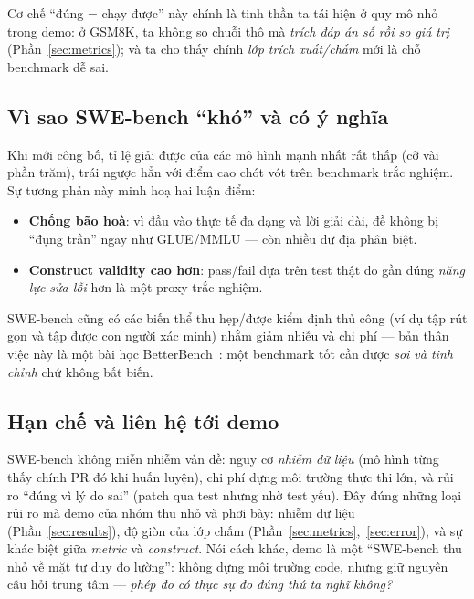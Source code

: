 Cơ chế ``đúng = chạy được'' này chính là tinh thần ta tái hiện ở quy mô nhỏ trong
demo: ở GSM8K, ta không so chuỗi thô mà \emph{trích đáp án số rồi so giá trị}
(Phần~\ref{sec:metrics}); và ta cho thấy chính \emph{lớp trích xuất/chấm} mới là
chỗ benchmark dễ sai.

\subsection{Vì sao SWE-bench ``khó'' và có ý nghĩa}

Khi mới công bố, tỉ lệ giải được của các mô hình mạnh nhất rất thấp (cỡ vài phần
trăm), trái ngược hẳn với điểm cao chót vót trên benchmark trắc nghiệm. Sự tương
phản này minh hoạ hai luận điểm:

\begin{itemize}
  \item \textbf{Chống bão hoà}: vì đầu vào thực tế đa dạng và lời giải dài, đề
    không bị ``đụng trần'' ngay như GLUE/MMLU --- còn nhiều dư địa phân biệt.
  \item \textbf{Construct validity cao hơn}: pass/fail dựa trên test thật đo gần
    đúng \emph{năng lực sửa lỗi} hơn là một proxy trắc nghiệm.
\end{itemize}

SWE-bench cũng có các biến thể thu hẹp/được kiểm định thủ công (ví dụ tập rút gọn
và tập được con người xác minh) nhằm giảm nhiễu và chi phí --- bản thân việc này
là một bài học BetterBench~\cite{betterbench}: một benchmark tốt cần được
\emph{soi và tinh chỉnh} chứ không bất biến.

\subsection{Hạn chế và liên hệ tới demo}

SWE-bench không miễn nhiễm vấn đề: nguy cơ \emph{nhiễm dữ liệu} (mô hình từng thấy
chính PR đó khi huấn luyện), chi phí dựng môi trường thực thi lớn, và rủi ro
``đúng vì lý do sai'' (patch qua test nhưng nhờ test yếu). Đây đúng những loại rủi
ro mà demo của nhóm thu nhỏ và phơi bày: nhiễm dữ liệu (Phần~\ref{sec:results}),
độ giòn của lớp chấm (Phần~\ref{sec:metrics},~\ref{sec:error}), và sự khác biệt
giữa \emph{metric} và \emph{construct}. Nói cách khác, demo là một ``SWE-bench thu
nhỏ về mặt tư duy đo lường'': không dựng môi trường code, nhưng giữ nguyên câu hỏi
trung tâm --- \emph{phép đo có thực sự đo đúng thứ ta nghĩ không?}

